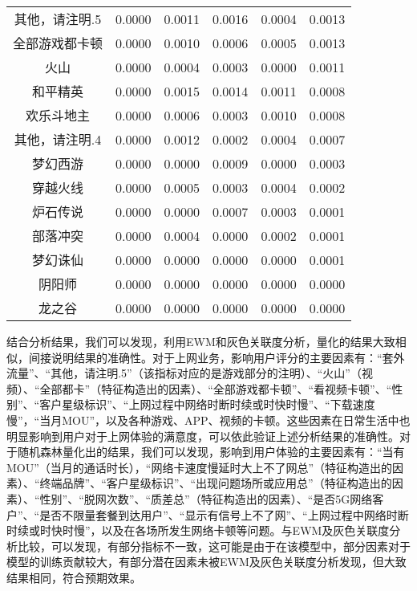 \documentclass{MathorCupmodeling}
\begin{document}
\begin{table}[htbp]
{\begin{tabular}{c|cccc|c}
	  其他，请注明.5 & 0.0000  & 0.0011  & 0.0016  & 0.0004  & 0.0013  \\
	  全部游戏都卡顿 & 0.0000  & 0.0010  & 0.0006  & 0.0005  & 0.0013  \\
	  火山    & 0.0000  & 0.0004  & 0.0003  & 0.0000  & 0.0011  \\
	  和平精英  & 0.0000  & 0.0015  & 0.0014  & 0.0011  & 0.0008  \\
	  欢乐斗地主 & 0.0000  & 0.0006  & 0.0003  & 0.0010  & 0.0008  \\
	  其他，请注明.4 & 0.0000  & 0.0012  & 0.0002  & 0.0004  & 0.0007  \\
	  梦幻西游  & 0.0000  & 0.0000  & 0.0009  & 0.0000  & 0.0003  \\
	  穿越火线  & 0.0000  & 0.0005  & 0.0003  & 0.0004  & 0.0002  \\
	  炉石传说  & 0.0000  & 0.0000  & 0.0007  & 0.0003  & 0.0001  \\
	  部落冲突  & 0.0000  & 0.0004  & 0.0000  & 0.0002  & 0.0001  \\
	  梦幻诛仙  & 0.0000  & 0.0000  & 0.0000  & 0.0000  & 0.0001  \\
	  阴阳师   & 0.0000  & 0.0000  & 0.0000  & 0.0000  & 0.0000  \\
	  龙之谷   & 0.0000  & 0.0000  & 0.0000  & 0.0000  & 0.0000  \\
	  \bottomrule
	  \end{tabular}}
	\label{tab:a2allquantizationB}
  	\end{table}
  
	
	结合分析结果，我们可以发现，利用EWM和灰色关联度分析，量化的结果大致相似，间接说明结果的准确性。对于上网业务，影响用户评分的主要因素有：“套外流量”、“其他，请注明.5”（该指标对应的是游戏部分的注明）、“火山”（视频）、“全部都卡”（特征构造出的因素）、“全部游戏都卡顿”、“看视频卡顿”、“性别”、“客户星级标识”、“上网过程中网络时断时续或时快时慢”、“下载速度慢”，“当月MOU”，以及各种游戏、APP、视频的卡顿。这些因素在日常生活中也明显影响到用户对于上网体验的满意度，可以依此验证上述分析结果的准确性。对于随机森林量化出的结果，我们可以发现，影响到用户体验的主要因素有：“当有MOU”（当月的通话时长），“网络卡速度慢延时大上不了网总”（特征构造出的因素）、“终端品牌”、“客户星级标识”、“出现问题场所或应用总”（特征构造出的因素）、“性别”、“脱网次数”、“质差总”（特征构造出的因素）、“是否5G网络客户”、“是否不限量套餐到达用户”、“显示有信号上不了网”、“上网过程中网络时断时续或时快时慢”，以及在各场所发生网络卡顿等问题。与EWM及灰色关联度分析比较，可以发现，有部分指标不一致，这可能是由于在该模型中，部分因素对于模型的训练贡献较大，有部分潜在因素未被EWM及灰色关联度分析发现，但大致结果相同，符合预期效果。
	
\end{document}
